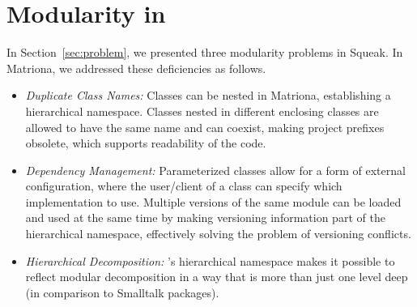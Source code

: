 \section{Modularity in \msname}
In Section~\ref{sec:problem}, we presented three modularity problems in Squeak. In Matriona, we addressed these deficiencies as follows.

\begin{itemize}
	\item \emph{Duplicate Class Names:} Classes can be nested in Matriona, establishing a hierarchical namespace. Classes nested in different enclosing classes are allowed to have the same name and can coexist, making project prefixes obsolete, which supports readability of the code.
	\item \emph{Dependency Management:} Parameterized classes allow for a form of external configuration, where the user/client of a class can specify which implementation to use. Multiple versions of the same module can be loaded and used at the same time by making versioning information part of the hierarchical namespace, effectively solving the problem of versioning conflicts.
	\item \emph{Hierarchical Decomposition:} \msname's hierarchical namespace makes it possible to reflect modular decomposition in a way that is more than just one level deep (in comparison to Smalltalk packages).
\end{itemize}

